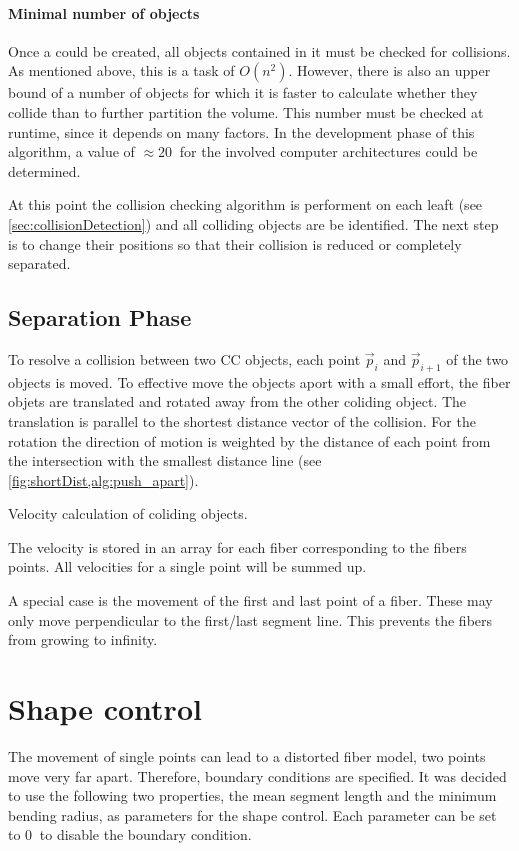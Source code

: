 \paragraph{Minimal number of objects}
Once a  could be created, all objects contained in it must be checked for collisions.
As mentioned above, this is a task of $O(n^2)$.
However, there is also an upper bound of a number of objects for which it is faster to calculate whether they collide than to further partition the volume.
This number must be checked at runtime, since it depends on many factors.
In the development phase of this algorithm, a value of $\approx \SI{20}{}$ for the involved computer architectures could be determined.
\par
%
At this point the collision checking algorithm is performent on each leaft (see \cref{sec:collisionDetection}) and all colliding objects are be identified.
The next step is to change their positions so that their collision is reduced or completely separated.
%
\subsection{Separation Phase}
% 
To resolve a collision between two \ac{CC} objects, each point $\vec{p}_i$ and $\vec{p}_{i+1}$ of the two objects is moved.
To effective move the objects aport with a small effort, the fiber objets are translated and rotated away from the other coliding object.
The translation is parallel to the shortest distance vector of the collision.
For the rotation the direction of motion is weighted by the distance of each point from the intersection with the smallest distance line (see \cref{fig:shortDist,alg:push_apart}).
% 
\begin{lstfloat}[!h]

\caption{Velocity calculation of coliding objects.}
\label{alg:push_apart}
\end{lstfloat}
% 
\par
%
The velocity is stored in an array for each fiber corresponding to the fibers points.
All velocities for a single point will be summed up.

\par
% 
A special case is the movement of the first and last point of a fiber.
These may only move perpendicular to the first/last segment line.
This prevents the fibers from growing to infinity.
% 
% 
%
\section{Shape control}\label{chap5:ShapeControl}
% 
The movement of single points can lead to a distorted fiber model, \eg{} two points move very far apart.
Therefore, boundary conditions are specified.
It was decided to use the following two properties, the mean segment length and the minimum bending radius, as parameters for the shape control.
Each parameter can be set to $\SI{0}{}$ to disable the boundary condition.
%
% 
% 
